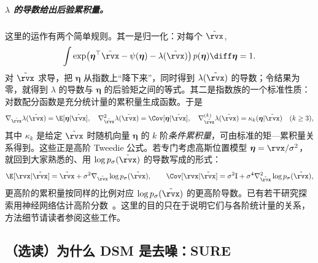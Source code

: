 \subparagraph{$\lambda$ 的导数给出后验累积量。}
这里的运作有两个简单规则。其一是归一化：对每个 $\tilde{\rvx}$,
\[
\int \exp\!\big(\boldsymbol\eta^\top \tilde{\rvx}-\psi(\boldsymbol\eta)-\lambda(\tilde{\rvx})\big)\,p(\boldsymbol\eta)\diff\boldsymbol\eta
=1.
\]
对 $\tilde{\rvx}$ 求导，把 $\boldsymbol\eta$ 从指数上“降下来”，同时得到 $\lambda(\tilde{\rvx})$ 的导数；令结果为零，就得到 $\lambda$ 的导数与 $\boldsymbol\eta$ 的后验矩之间的等式。其二是指数族的一个标准性质：对数配分函数是充分统计量的累积量生成函数。于是
\[
\nabla_{\tilde{\rvx}}\lambda(\tilde{\rvx})=\E[\boldsymbol\eta|\tilde{\rvx}],\quad
\nabla_{\tilde{\rvx}}^{2}\lambda(\tilde{\rvx})=\Cov[\boldsymbol\eta|\tilde{\rvx}],\quad
\nabla_{\tilde{\rvx}}^{(k)}\lambda(\tilde{\rvx})=\kappa_k(\boldsymbol\eta|\tilde{\rvx})\quad(k\ge 3),
\]
其中 $\kappa_k$ 是给定 $\tilde{\rvx}$ 时随机向量 $\boldsymbol\eta$ 的 $k$ 阶\emph{条件累积量}，可由标准的矩—累积量关系得到。这些正是高阶 Tweedie 公式。若专门考虑高斯位置模型 $\boldsymbol\eta=\rvx/\sigma^2$，就回到大家熟悉的、用 $\log p_\sigma(\tilde{\rvx})$ 的导数写成的形式：
\[
\E[\rvx|\tilde{\rvx}]
=\tilde{\rvx}+\sigma^2\nabla_{\tilde{\rvx}}\log p_\sigma(\tilde{\rvx}),
\qquad
\Cov[\rvx|\tilde{\rvx}]
=\sigma^2\mathrm I+\sigma^4\nabla_{\tilde{\rvx}}^{2}\log p_\sigma(\tilde{\rvx}),
\]
更高阶的累积量按同样的比例对应 $\log p_\sigma(\tilde{\rvx})$ 的更高阶导数。已有若干研究探索用神经网络估计高阶分数~\citep{meng2021estimating,lu2022maximum,lai2023fp}。这里的目的只在于说明它们与各阶统计量的关系，方法细节请读者参阅这些工作。

\subsection{（选读）为什么 DSM 是去噪：SURE}\label{subsec:why-dsm-denoising-sure}


